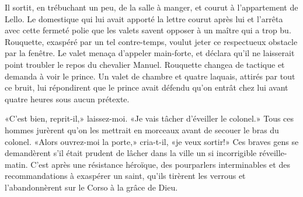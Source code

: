 Il sortit, en trébuchant un peu, de la salle à manger, et courut à l'appartement de Lello. Le domestique qui lui avait apporté la lettre courut après lui et l'arrêta avec cette fermeté polie que les valets savent opposer à un maître qui a trop bu. Rouquette, exaspéré par un tel contre-temps, voulut jeter ce respectueux obstacle par la fenêtre. Le valet menaça d'appeler main-forte, et déclara qu'il ne laisserait point troubler le repos du chevalier Manuel. Rouquette changea de tactique et demanda à voir le prince. Un valet de chambre et quatre laquais, attirés par tout ce bruit, lui répondirent que le prince avait défendu qu'on entrât chez lui avant quatre heures sous aucun prétexte.

«C'est bien, reprit-il,» laissez-moi. «Je vais tâcher d'évei\-ller le colonel.» Tous ces hommes jurèrent qu'on les mettrait en morceaux avant de secouer le bras du colonel. «Alors ouvrez-moi la porte,» cria-t-il, «je veux sortir!» Ces braves gens se demandèrent s'il était prudent de lâcher dans la ville un si incorrigible réveille-matin. C'est après une résistance héroïque, des pourparlers interminables et des recommandations à exaspérer un saint, qu'ils tirèrent les verrous et l'abandonnèrent sur le Corso à la grâce de Dieu.

\enlargethispage{\baselineskip}

